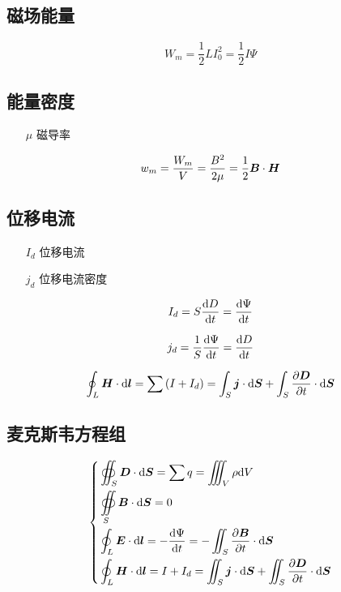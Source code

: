 \documentclass{article}
\begin{document}
\subsection{磁场能量}

\[W_m=\frac12LI_0^2=\frac12I\Psi\]

\subsection{能量密度}

\begin{enumerate}
    \item [$\mu$] 磁导率
\end{enumerate}

\[w_m=\frac{W_m}V=\frac{B^2}{2\mu}=\frac12\boldsymbol{B}\cdot\boldsymbol{H}\]

\subsection{位移电流}

\begin{enumerate}
    \item [$I_d$] 位移电流
    \item [$j_d$] 位移电流密度
\end{enumerate}

\[I_d=S\frac{\mathrm d D}{\mathrm d t}=\frac{\mathrm d\Psi}{\mathrm d t}\]

\[j_d=\frac1S\frac{\mathrm d\Psi}{\mathrm d t}=\frac{\mathrm d D}{\mathrm d t}\]

\[\oint_L\boldsymbol{H}\cdot\mathrm d\boldsymbol{l}=\sum\left(I+I_d\right)=\int_S\boldsymbol{j}\cdot\mathrm d\boldsymbol{S}+\int_S\frac{\partial\boldsymbol{D}}{\partial t}\cdot\mathrm d\boldsymbol{S}\]

\subsection{麦克斯韦方程组}

\[\left\{\begin{aligned}
         & \oiint_S\boldsymbol{D}\cdot\mathrm d\boldsymbol{S}=\sum q=\iiint_V\rho\mathrm d V                                                           \\
         & \oiint\limits_S\boldsymbol{B}\cdot\mathrm d\boldsymbol{S}=0                                                                          \\
         & \oint_L\boldsymbol{E}\cdot\mathrm d\boldsymbol{l}=-\frac{\mathrm d\Psi}{\mathrm d t}=-\iint_S\frac{\partial\boldsymbol{B}}{\partial t}\cdot\mathrm d\boldsymbol{S}          \\
         & \oint_L\boldsymbol{H}\cdot\mathrm d\boldsymbol{l}=I+I_d=\iint_S\boldsymbol{j}\cdot\mathrm d\boldsymbol{S}+\iint_S\frac{\partial\boldsymbol{D}}{\partial t}\cdot\mathrm d\boldsymbol{S} \\
    \end{aligned}\right.\]
\end{document}
